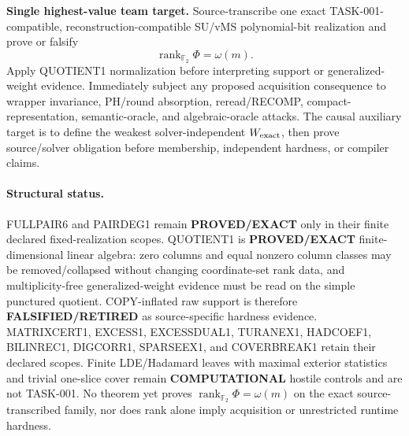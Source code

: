 \documentclass[11pt]{article}
\begin{document}
\begin{candidatebox}
\textbf{Single highest-value team target.}
Source-transcribe one exact TASK-001-compatible, reconstruction-compatible SU/vMS
polynomial-bit realization and prove or falsify
\[
\operatorname{rank}_{\mathbb F_2}\Phi=\omega(m).
\]
Apply QUOTIENT1 normalization before interpreting support or generalized-weight evidence.
Immediately subject any proposed acquisition consequence to wrapper invariance, PH/round
absorption, reread/RECOMP, compact-representation, semantic-oracle, and algebraic-oracle
attacks. The causal auxiliary target is to define the weakest solver-independent
\(W_{\rm exact}\), then prove source/solver obligation before membership, independent
hardness, or compiler claims.
\end{candidatebox}

\paragraph{Structural status.}
FULLPAIR6 and PAIRDEG1 remain \textbf{PROVED/EXACT} only in their finite declared
fixed-realization scopes. QUOTIENT1 is \textbf{PROVED/EXACT} finite-dimensional linear
algebra: zero columns and equal nonzero column classes may be removed/collapsed without
changing coordinate-set rank data, and multiplicity-free generalized-weight evidence must be
read on the simple punctured quotient. COPY-inflated raw support is therefore
\textbf{FALSIFIED/RETIRED} as source-specific hardness evidence. MATRIXCERT1, EXCESS1,
EXCESSDUAL1, TURANEX1, HADCOEF1, BILINREC1, DIGCORR1, SPARSEEX1, and COVERBREAK1
retain their declared scopes. Finite LDE/Hadamard leaves with maximal exterior statistics and
trivial one-slice cover remain \textbf{COMPUTATIONAL} hostile controls and are not TASK-001.
No theorem yet proves \(\operatorname{rank}_{\mathbb F_2}\Phi=\omega(m)\) on the
exact source-transcribed family, nor does rank alone imply acquisition or unrestricted runtime
hardness.
\end{document}
